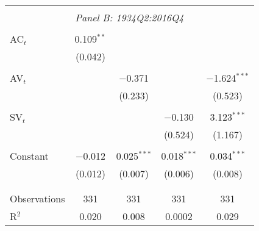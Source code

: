 \begin{table}[!htbp]
\begin{adjustbox}{height=4in,width=6in}
\begin{tabular}{@{\extracolsep{5pt}}lcccc}
			\hline 
			\hline \\[-1.8ex]
			\multicolumn{5}{c}{\textit{Panel B: 1934Q2:2016Q4}} \\
			\cline{2-5}
			\hline \\[-1.8ex] 
			 AC$_{t}$ & 0.109$^{**}$ &  &  &  \\ 
			 & (0.042) &  &  &  \\ 
			 & & & & \\ 
			 AV$_{t}$ &  & $-$0.371 &  & $-$1.624$^{***}$ \\ 
			 &  & (0.233) &  & (0.523) \\ 
			 & & & & \\ 
			 SV$_{t}$ &  &  & $-$0.130 & 3.123$^{***}$ \\ 
			 &  &  & (0.524) & (1.167) \\ 
			 & & & & \\ 
			 Constant & $-$0.012 & 0.025$^{***}$ & 0.018$^{***}$ & 0.034$^{***}$ \\ 
			 & (0.012) & (0.007) & (0.006) & (0.008) \\ 
			 & & & & \\ 
			 \hline \\[-1.8ex] 
			 Observations & 331 & 331 & 331 & 331 \\ 
			 R$^{2}$ & 0.020 & 0.008 & 0.0002 & 0.029 \\

\end{tabular}
\end{adjustbox}
\end{table}
